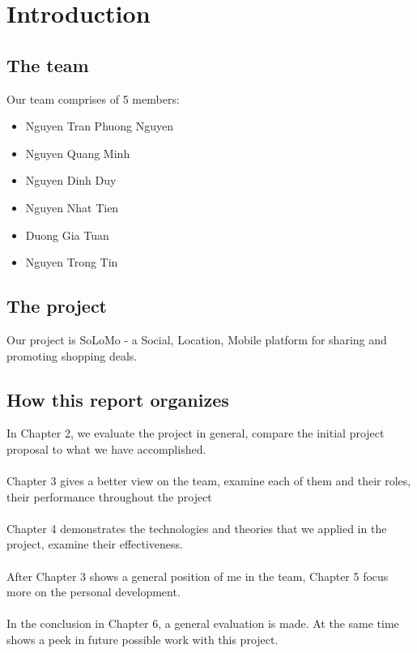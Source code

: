 \chapter{Introduction}
\section{The team}
Our team comprises of 5 members:
\begin{itemize}
	\item Nguyen Tran Phuong Nguyen
	\item Nguyen Quang Minh
	\item Nguyen Dinh Duy
	\item Nguyen Nhat Tien
	\item Duong Gia Tuan
	\item Nguyen Trong Tin
\end{itemize}
\section{The project}
Our project is SoLoMo - a Social, Location, Mobile platform for sharing and promoting shopping deals.
\section{How this report organizes}
In Chapter 2, we evaluate the project in general, compare the initial project proposal to what we have accomplished.
\\
\\
Chapter 3 gives a better view on the team, examine each of them and their roles, their performance throughout the project
\\
\\
Chapter 4 demonstrates the technologies and theories that we applied in the project, examine their effectiveness.
\\
\\
After Chapter 3 shows a general position of me in the team, Chapter 5 focus more on the personal development.
\\
\\
In the conclusion in Chapter 6, a general evaluation is made. At the same time shows a peek in future possible work with this project.